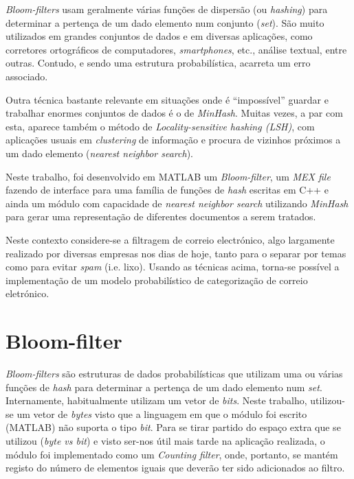 \documentclass[a4paper,11pt,openright,oneside]{report}
\begin{document}
\textit{Bloom-filters} usam geralmente várias funções de dispersão (ou \textit{hashing}) para determinar a pertença de um dado elemento num conjunto (\textit{set}). São muito utilizados em grandes conjuntos de dados e em diversas aplicações, como corretores ortográficos de computadores, \textit{smartphones}, etc., análise textual, entre outras. Contudo, e sendo uma estrutura probabilística, acarreta um erro associado.

Outra técnica bastante relevante em situações onde é ``impossível'' guardar e trabalhar enormes conjuntos de dados é o de \textit{MinHash}. Muitas vezes, a par com esta, aparece também o método de \textit{Locality-sensitive hashing (LSH)}, com aplicações usuais em \textit{clustering} de informação e procura de vizinhos próximos a um dado elemento (\textit{nearest neighbor search}).

Neste trabalho, foi desenvolvido em MATLAB um \textit{Bloom-filter}, um \textit{MEX file} fazendo de interface para uma família de funções de \textit{hash} escritas em C++ e ainda um módulo com capacidade de \textit{nearest neighbor search} utilizando \textit{MinHash} para gerar uma representação de diferentes documentos a serem tratados.

Neste contexto considere-se a filtragem de correio electrónico, algo largamente realizado por diversas empresas nos dias de hoje, tanto para o separar por temas como para evitar \textit{spam} (i.e. lixo). Usando as técnicas acima, torna-se possível a implementação de um modelo probabilístico de categorização de correio eletrónico.

\chapter{Bloom-filter}
\label{chap.bloom}

\textit{Bloom-filters} são estruturas de dados probabilísticas que utilizam uma ou várias funções de \textit{hash} para determinar a pertença de um dado elemento num \textit{set}. Internamente, habitualmente utilizam um vetor de \textit{bits}. Neste trabalho, utilizou-se um vetor de \textit{bytes} visto que a linguagem em que o módulo foi escrito (MATLAB) não suporta o tipo \textit{bit}. Para se tirar partido do espaço extra que se utilizou (\textit{byte vs bit}) e visto ser-nos útil mais tarde na aplicação realizada, o módulo foi implementado como um \textit{Counting filter}, onde, portanto, se mantém registo do número de elementos iguais que deverão ter sido adicionados ao filtro.
\end{document}
